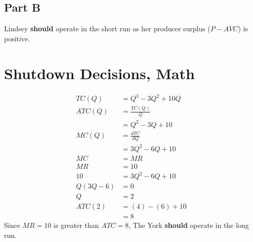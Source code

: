\documentclass[8pt]{extarticle}
\begin{document}
{\subsection*{Part B}%
\label{sub:Part B}
Lindsey \textbf{should} operate in the short run as her producer surplus ($P-AVC$) is positive.
\section{Shutdown Decisions, Math}
\label{sec:Shutdown Decisions, Math}
\begin{align*}
	\label{eq:}
	TC(Q) &= Q^3 -3Q^2 + 10Q \\
	ATC(Q) &= \frac{TC(Q)}{Q} \\
	&= Q^2 - 3Q + 10 \\
	MC(Q) &= \frac{dTC}{dQ} \\
	&= 3Q^2 - 6Q + 10 \\
	MC &= MR \\
	MR &= 10 \\
	10 &= 3Q^2 - 6Q + 10 \\
	Q(3Q-6) &= 0\\
	Q &= 2 \\
	ATC(2) &= (4)-(6) + 10 \\
	&= 8
\end{align*}
Since $MR = 10$ is greater than $ATC = 8$, The York \textbf{should} operate in the long run.
}
\end{document}
